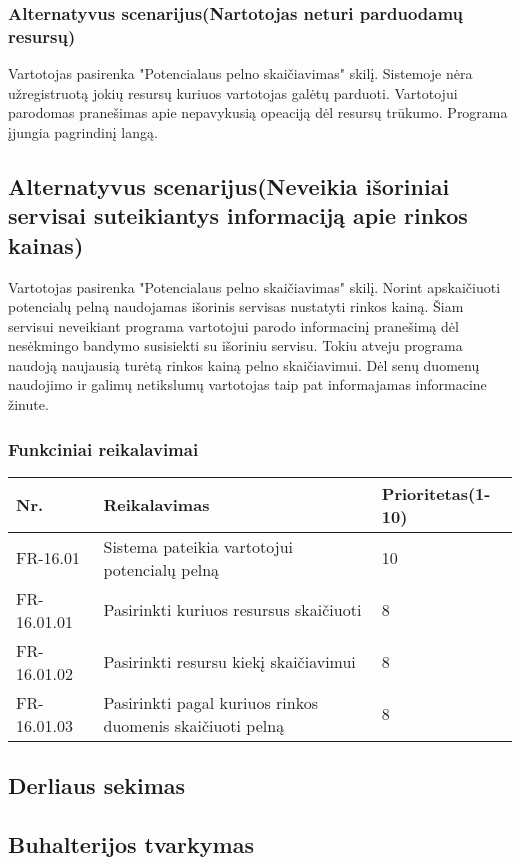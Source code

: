 \documentclass[oneside]{VUMIFPSkursinis}
\begin{document}
	\subsubsection{Alternatyvus scenarijus(Nartotojas neturi parduodamų resursų)}
	Vartotojas pasirenka "Potencialaus pelno skaičiavimas" skilį. Sistemoje nėra užregistruotą jokių resursų kuriuos vartotojas galėtų parduoti. Vartotojui parodomas pranešimas apie nepavykusią opeaciją dėl resursų trūkumo. Programa įjungia pagrindinį langą. 
	\subsection{Alternatyvus scenarijus(Neveikia išoriniai servisai suteikiantys informaciją apie rinkos kainas)}
	Vartotojas pasirenka "Potencialaus pelno skaičiavimas" skilį. Norint apskaičiuoti potencialų pelną naudojamas išorinis servisas nustatyti rinkos kainą. Šiam servisui neveikiant programa vartotojui parodo informacinį pranešimą dėl nesėkmingo bandymo susisiekti su išoriniu servisu. Tokiu atveju programa naudoją naujausią turėtą rinkos kainą pelno skaičiavimui. Dėl senų duomenų naudojimo ir galimų netikslumų vartotojas taip pat informajamas informacine žinute.
	\subsubsection{Funkciniai reikalavimai}
\begin{table}[htbp]
	\begin{tabularx}{1\textwidth}{ |P{2.5cm}|X|P{3cm }| }  \hline
		Nr. & Reikalavimas & Prioritetas(1-10) \\ \hline
		FR-16.01 & Sistema pateikia vartotojui potencialų pelną & 10 \\ \hline
		FR-16.01.01 & Pasirinkti kuriuos resursus skaičiuoti & 8 \\ \hline
		FR-16.01.02 & Pasirinkti resursu kiekį skaičiavimui & 8 \\ \hline
		FR-16.01.03 & Pasirinkti pagal kuriuos rinkos duomenis skaičiuoti pelną & 8 \\ \hline
	\end{tabularx}
\end{table}	
	 
\subsection{Derliaus sekimas}
\subsection{Buhalterijos tvarkymas}
\end{document}
